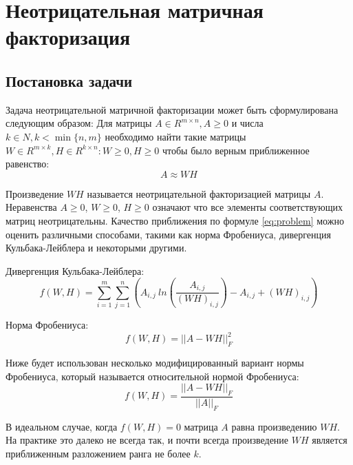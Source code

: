 
\chapter{Неотрицательная матричная факторизация}





\section{Постановка задачи}

Задача неотрицательной матричной факторизации может быть сформулирована следующим образом:
Для матрицы $A \in R^{m \times n}, A \geq 0$ и числа $k \in N, k < \min\{n, m\}$
необходимо найти  такие матрицы $W \in R^{m \times k}, H \in R^{k \times n} : W \geq 0, H \geq 0$ чтобы было верным приближенное равенство:
\begin{equation} \label{eq:problem}
  A \approx W H
\end{equation}

Произведение $WH$ называется неотрицательной факторизацией матрицы $A$. Неравенства $A \geq 0$, $W \geq 0$, $H \geq 0$ означают что все элементы соответствующих матриц неотрицательны.
Качество приближения по формуле \eqref{eq:problem} можно оценить различными способами, такими как норма Фробениуса,
дивергенция Кульбака-Лейблера и некоторыми другими.

Дивергенция Кульбака-Лейблера:
\begin{equation*}
  f(W, H) =
    \sum_{i=1}^m \sum_{j=1}^n
    \left(
      A_{i,j} \
      ln\left(
        \frac{A_{i,j}}{(WH)_{i,j}}
      \right)
      - A_{i,j}
      + (WH)_{i,j}
    \right)
\end{equation*}

Норма Фробениуса:
\begin{equation*}
  f(W, H) = || A - WH ||^2_F
\end{equation*}

Ниже будет использован несколько модифицированный вариант нормы Фробениуса,
который называется относительной нормой Фробениуса:
\begin{equation} \label{eq:frob_norm}
  f(W, H) = \dfrac{||A - WH||_F}{|| A ||_F}
\end{equation}

В идеальном случае, когда $f(W,H)=0$ матрица $A$ равна произведению $WH$.
На практике это далеко не всегда так, и почти всегда произведение $WH$ является приближенным разложением ранга не более $k$.


